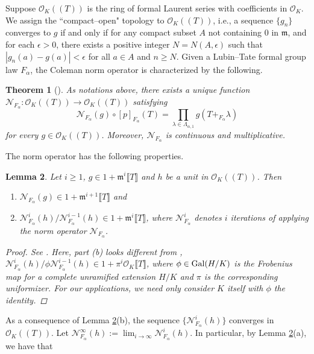 \documentclass[12pt]{article}
\newtheorem{theorem}{Theorem}[section]
\newtheorem{lemma}[theorem]{Lemma}
\theoremstyle{definition}
\newcommand{\PS}[1]{\llbracket #1 \rrbracket}
\newcommand{\LS}[1]{(\!( #1 )\!)}
\def\CN{\mathscr{N}}
\def\Gal{{\rm Gal}}
\def\m{\mathfrak{m}}
\def\O{\mathcal{O}}
\begin{document}
    Suppose $\O_K\LS{T}$ is the ring of formal Laurent series with coefficients in $\O_K$. We assign the ``compact--open" topology to $\O_K\LS{T}$, i.e., a sequence $\{g_n\}$ converges to $g$ if and only if for any compact subset $A$ not containing $0$ in $\m$, and for each $\epsilon > 0$, there exists a positive integer $N = N(A,\epsilon)$ such that $|g_n(a) - g(a)| < \epsilon$ for all $a \in A$ and $n \geqslant N$. Given a Lubin--Tate formal group law $F_\alpha$, the Coleman norm operator is characterized by the following.  
    \begin{theorem} [{{\cite[Theorem 11 and Corollary 12]{Col79}}}] \label{Coleman Norm Operator}
        As notations above, there exists a unique function $\CN_{F_\alpha} \colon \O_K\LS{T} \to \O_K\LS{T}$ satisfying
        \begin{equation*}
            \CN_{F_\alpha}(g) \circ [p]_{F_\alpha}(T) = \prod_{\lambda \in \Lambda_{\alpha,1}} g(T +_{F_\alpha} \lambda)
        \end{equation*}
        for every $g \in \O_K\LS{T}$. Moreover, $\CN_{F_\alpha}$ is continuous and multiplicative. 
    \end{theorem}
    The norm operator has the following properties. 
    \begin{lemma} \label{Properties of CN}
        Let $i \geqslant 1$, $g \in 1 + \m^i\PS{T}$ and $h$ be a unit in $\O_K\LS{T}$. Then 
        \begin{enumerate}
            \item [(a)] $\CN_{F_\alpha}(g) \in 1 + \m^{i+1}\PS{T}$ and 
            \item [(b)] $\CN_{F_\alpha}^{i}(h)/\CN_{F_\alpha}^{i-1}(h) \in 1 + \m^i \PS{T}$, where $\CN_{F_\alpha}^i$ denotes $i$ iterations of applying the norm operator $\CN_{F_\alpha}$.  
        \end{enumerate}
        \begin{proof}
            See \cite[Lemma 13]{Col79}. Here, part (b) looks different from \cite[Lemma 13(b)]{Col79}, $\CN_{F_\alpha}^{i}(h)/\phi\CN_{F_\alpha}^{i-1}(h) \in 1 + \pi^i \O_K\PS{T}$, where $\phi \in \Gal(H/K)$ is the Frobenius map for a complete unramified extension $H/K$ and $\pi$ is the corresponding uniformizer. For our applications, we need only consider $K$ itself with $\phi$ the identity. 
        \end{proof}
    \end{lemma}
    As a consequence of Lemma \ref{Properties of CN}(b), the sequence $\{\CN_{F_\alpha}^i(h)\}$ converges in $\O_K\LS{T}$. Let $\CN_{F_\alpha}^\infty(h) := \displaystyle\lim_{i \to \infty} \CN_{F_\alpha}^i(h)$. In particular, by Lemma \ref{Properties of CN}(a), we have that 
\end{document}
